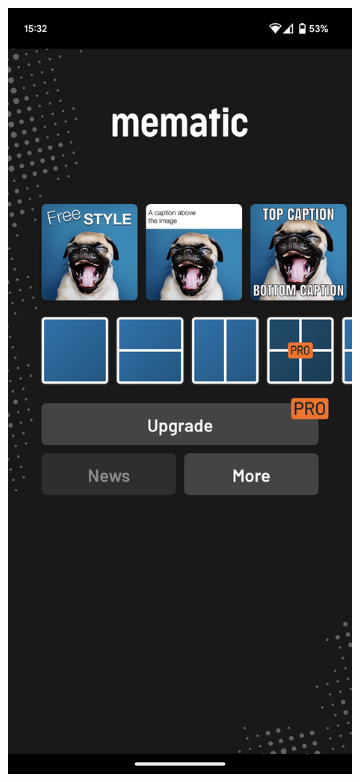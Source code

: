 \begin{figure}
\begin{subfigure}{0.3\textwidth}
        \includegraphics[width=\linewidth]{text/img/mematic/initial-screen.png}

\end{subfigure}
\end{figure}
